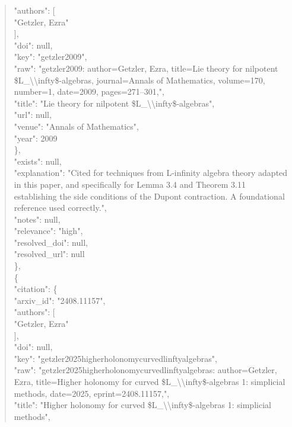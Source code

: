\documentclass[11pt]{article}
\begin{document}
\begin{quote}
        "authors": [\\
          "Getzler, Ezra"\\
        ],\\
        "doi": null,\\
        "key": "getzler2009",\\
        "raw": "getzler2009: author=Getzler, Ezra, title=Lie theory for nilpotent \$L\_\textbackslash{}\textbackslash{}infty\$-algebras, journal=Annals of Mathematics, volume=170, number=1, date=2009, pages=271--301,",\\
        "title": "Lie theory for nilpotent \$L\_\textbackslash{}\textbackslash{}infty\$-algebras",\\
        "url": null,\\
        "venue": "Annals of Mathematics",\\
        "year": 2009\\
      \},\\
      "exists": null,\\
      "explanation": "Cited for techniques from L-infinity algebra theory adapted in this paper, and specifically for Lemma 3.4 and Theorem 3.11 establishing the side conditions of the Dupont contraction. A foundational reference used correctly.",\\
      "notes": null,\\
      "relevance": "high",\\
      "resolved\_doi": null,\\
      "resolved\_url": null\\
    \},\\
    \{\\
      "citation": \{\\
        "arxiv\_id": "2408.11157",\\
        "authors": [\\
          "Getzler, Ezra"\\
        ],\\
        "doi": null,\\
        "key": "getzler2025higherholonomycurvedlinftyalgebras",\\
        "raw": "getzler2025higherholonomycurvedlinftyalgebras: author=Getzler, Ezra, title=Higher holonomy for curved \$L\_\textbackslash{}\textbackslash{}infty\$-algebras 1: simplicial methods, date=2025, eprint=2408.11157,",\\
        "title": "Higher holonomy for curved \$L\_\textbackslash{}\textbackslash{}infty\$-algebras 1: simplicial methods",\\

\end{quote}
\end{document}
